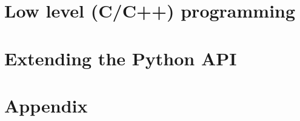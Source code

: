 \documentclass[11pt,fleqn]{book}
\begin{document}
 

 \thispagestyle{empty}
 \newpage
 \cleardoublepage 

 \pagestyle{plain}
 

 \cleardoublepage 
 
 \tableofcontents

 \newpage

 \cleardoublepage 

 \pagestyle{plain}
 
 
 
 
 \part{Low level (C/C++) programming}
%  
% 
% 
%  
% 
%   
% 
 \newpage
 
%   
%   
%   
%   
% 
% 
 \part{Extending the Python API}
 \newpage
 
 
% 
% 
%   
% 
%   
%   
%   
% 
% 
%  
%   
%   
%   
% 
% 
% 
%   
%   
%   
%   
%   
%   
%   
%   
%   
%  
%  
 \appendix 
 \part{Appendix}

  

 
 \newpage
 
 \newpage
 
 \newpage
 
 \newpage
 
 \newpage
 
\end{document}
